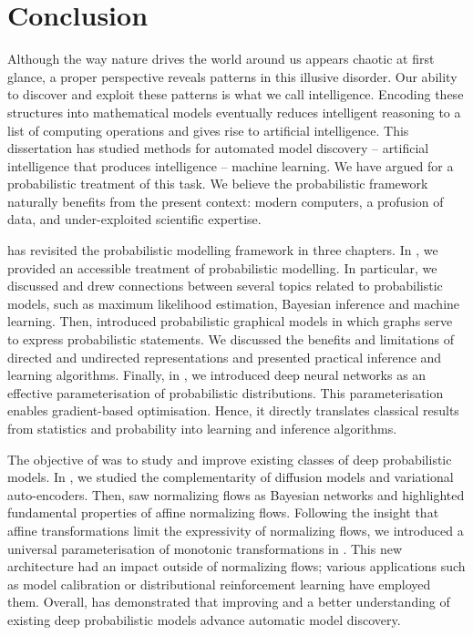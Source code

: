 \chapter{Conclusion}\label{ch:08}
Although the way nature drives the world around us appears chaotic at first glance, a proper perspective reveals patterns in this illusive disorder. Our ability to discover and exploit these patterns is what we call intelligence. Encoding these structures into mathematical models eventually reduces intelligent reasoning to a list of computing operations and gives rise to artificial intelligence. This dissertation has studied methods for automated model discovery -- artificial intelligence that produces intelligence -- machine learning. We have argued for a probabilistic treatment of this task. We believe the probabilistic framework naturally benefits from the present context: modern computers, a profusion of data, and under-exploited scientific expertise.

 has revisited the probabilistic modelling framework in three chapters. In , we provided an accessible treatment of probabilistic modelling. In particular, we discussed and drew connections between several topics related to probabilistic models, such as maximum likelihood estimation, Bayesian inference and machine learning. Then,  introduced probabilistic graphical models in which graphs serve to express probabilistic statements. We discussed the benefits and limitations of directed and undirected representations and presented practical inference and learning algorithms. Finally, in , we introduced deep neural networks as an effective parameterisation of probabilistic distributions. This parameterisation enables gradient-based optimisation. Hence, it directly translates classical results from statistics and probability into learning and inference algorithms.

The objective of  was to study and improve existing classes of deep probabilistic models. In , we studied the complementarity of diffusion models and variational auto-encoders. Then,  saw normalizing flows as Bayesian networks and highlighted fundamental properties of affine normalizing flows. Following the insight that affine transformations limit the expressivity of normalizing flows, we introduced a universal parameterisation of monotonic transformations in . This new architecture had an impact outside of normalizing flows; various applications such as model calibration or distributional reinforcement learning have employed them. Overall,  has demonstrated that improving and a better understanding of existing deep probabilistic models advance automatic model discovery.

